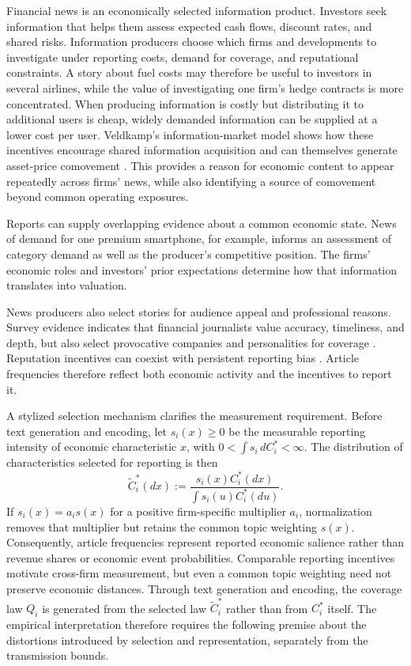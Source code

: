 Financial news is an economically selected information product.
Investors seek information that helps them assess expected cash flows,
discount rates, and shared risks.
Information producers choose which firms and developments to investigate
under reporting costs, demand for coverage, and reputational constraints.
A story about fuel costs may therefore be useful to investors in several
airlines, while the value of investigating one firm's hedge contracts is
more concentrated.
When producing information is costly but distributing it to additional users
is cheap, widely demanded information can be supplied at a lower cost per
user.
Veldkamp's information-market model shows how these incentives encourage
shared information acquisition and can themselves generate asset-price
comovement \citep{veldkamp_information_markets_2006}.
This provides a reason for economic content to appear repeatedly across
firms' news, while also identifying a source of comovement beyond common
operating exposures.

Reports can supply overlapping evidence about a common economic state.
News of demand for one premium smartphone, for example, informs an assessment
of category demand as well as the producer's competitive position.
The firms' economic roles and investors' prior expectations determine how
that information translates into valuation.

News producers also select stories for audience appeal and professional
reasons.
Survey evidence indicates that financial journalists value accuracy,
timeliness, and depth, but also select provocative companies and personalities
for coverage \citep{call_meet_press_2022}.
Reputation incentives can coexist with persistent reporting bias
\citep{gentzkow_media_bias_2006}.
Article frequencies therefore reflect both economic activity and the
incentives to report it.

A stylized selection mechanism clarifies the measurement requirement.
Before text generation and encoding, let $s_i(x)\ge0$ be the measurable
reporting intensity of economic characteristic $x$, with
$0<\int s_i\,dC_i^\ast<\infty$.
The distribution of characteristics selected for reporting is then
\begin{equation}\label{eq:news-selection}
  \widetilde C_i^\ast(dx)
  :=\frac{s_i(x)C_i^\ast(dx)}{\int s_i(u)C_i^\ast(du)}.
\end{equation}
If $s_i(x)=a_i s(x)$ for a positive firm-specific multiplier $a_i$,
normalization removes that multiplier but retains the common topic weighting
$s(x)$.
Consequently, article frequencies represent reported economic salience rather
than revenue shares or economic event probabilities.
Comparable reporting incentives motivate cross-firm measurement, but even a
common topic weighting need not preserve economic distances.
Through text generation and encoding, the coverage law $Q_i$ is generated
from the selected law $\widetilde C_i^\ast$ rather than from $C_i^\ast$ itself.
The empirical interpretation therefore requires the following premise about
the distortions introduced by selection and representation, separately from
the transmission bounds.

